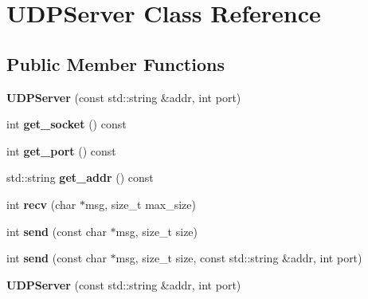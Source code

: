 \hypertarget{classUDPServer}{\section{\-U\-D\-P\-Server \-Class \-Reference}
\label{classUDPServer}
}
\subsection*{\-Public \-Member \-Functions}
\begin{DoxyCompactItemize}
\item 
\hypertarget{classUDPServer_a1c329d510895a368942ade66e27ded41}{{\bfseries \-U\-D\-P\-Server} (const std\-::string \&addr, int port)}\label{classUDPServer_a1c329d510895a368942ade66e27ded41}

\item 
\hypertarget{classUDPServer_afa98d6638cc862fc150867b4a7399ae2}{int {\bfseries get\-\_\-socket} () const }\label{classUDPServer_afa98d6638cc862fc150867b4a7399ae2}

\item 
\hypertarget{classUDPServer_a3fd4e5a227d9b417bcbf8e88268d200a}{int {\bfseries get\-\_\-port} () const }\label{classUDPServer_a3fd4e5a227d9b417bcbf8e88268d200a}

\item 
\hypertarget{classUDPServer_a736dde370ce9eb0d474a5fad266111fb}{std\-::string {\bfseries get\-\_\-addr} () const }\label{classUDPServer_a736dde370ce9eb0d474a5fad266111fb}

\item 
\hypertarget{classUDPServer_a69e88e5fcdeee3f0e9c5fe3cdfba9a74}{int {\bfseries recv} (char $\ast$msg, size\-\_\-t max\-\_\-size)}\label{classUDPServer_a69e88e5fcdeee3f0e9c5fe3cdfba9a74}

\item 
\hypertarget{classUDPServer_ae8585a5e5fd62713a970be89a99498ee}{int {\bfseries send} (const char $\ast$msg, size\-\_\-t size)}\label{classUDPServer_ae8585a5e5fd62713a970be89a99498ee}

\item 
\hypertarget{classUDPServer_a59a89ed608c268960cafc460601dcb39}{int {\bfseries send} (const char $\ast$msg, size\-\_\-t size, const std\-::string \&addr, int port)}\label{classUDPServer_a59a89ed608c268960cafc460601dcb39}

\item 
\hypertarget{classUDPServer_a1c329d510895a368942ade66e27ded41}{{\bfseries \-U\-D\-P\-Server} (const std\-::string \&addr, int port)}\label{classUDPServer_a1c329d510895a368942ade66e27ded41}


\end{DoxyCompactItemize}

